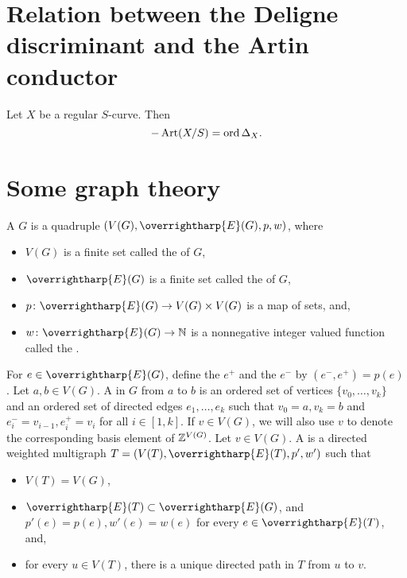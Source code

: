 \section{Relation between the Deligne discriminant and the Artin conductor}
\begin{thm}\cite[Theorem 1]{saito2}
 Let $X$ be a regular $S$-curve. Then \[-\operatorname{Art}(X/S) = \operatorname{ord} \Delta_X.\]
\end{thm}

\section{Some graph theory}\label{intrograph}
A {} $G$ is a quadruple $(V(G),\overrightharp{E}(G),p,w)$, where 
\begin{itemize}
 \item $V(G)$ is a finite set called the {} of $G$, 
 \item $\overrightharp{E}(G)$ is a finite set called the {} of $G$, 
 \item $p \colon \overrightharp{E}(G) \rightarrow V(G) \times V(G)$ is a map of sets, and,
 \item $w \colon \overrightharp{E}(G) \rightarrow \N$ is a nonnegative integer valued function called the {}. 
\end{itemize}
For $e \in \overrightharp{E}(G)$, define the {} $e^+$ and the {} $e^-$ by $(e^-,e^+) = p(e)$. Let $a,b \in V(G)$. A {} in $G$ from $a$ to $b$ is an ordered set of vertices $\{v_0, \ldots,v_k \}$ and an ordered set of directed edges $e_1, \ldots, e_k$ such that $v_0 = a, v_k = b$ and $e_i^- = v_{i-1}, e_i^+ = v_i$ for all $i \in [1,k]$. If $v \in V(G)$, we will also use $v$ to denote the corresponding basis element of $\mathbb Z^{V(G)}$. Let $v \in V(G)$. A {} is a directed weighted multigraph $T = (V(T),\overrightharp{E}(T),p',w')$ such that 
\begin{itemize}
 \item $V(T) = V(G)$, 
 \item $\overrightharp{E}(T) \subset \overrightharp{E}(G)$, and $p'(e) = p(e), w'(e) = w(e)$ for every $e \in \overrightharp{E}(T)$, and,
 \item for every $u \in V(T)$, there is a unique directed path in $T$ from $u$ to $v$.
\end{itemize}
